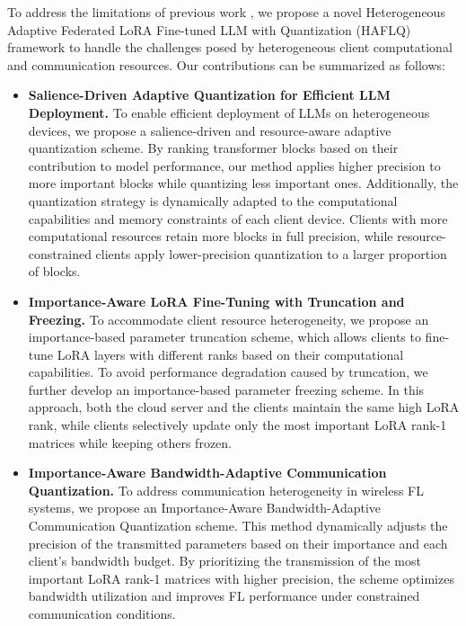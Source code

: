 \documentclass[journal]{IEEEtran}
\begin{document}
To address the limitations of previous work \cite{zhang2024towards,cho2023heterogeneous,jiamu2024federated,zhu2024promoting,fang2024automated}, we propose a novel Heterogeneous Adaptive Federated LoRA Fine-tuned LLM with Quantization (HAFLQ) framework to handle the challenges posed by heterogeneous client computational and communication resources.
Our contributions can be summarized as follows:
\begin{itemize}
\item \textbf{Salience-Driven Adaptive Quantization for Efficient LLM Deployment.} 
To enable efficient deployment of LLMs on heterogeneous devices, we propose a salience-driven and resource-aware adaptive quantization scheme. By ranking transformer blocks based on their contribution to model performance, our method applies higher precision to more important blocks while quantizing less important ones. Additionally, the quantization strategy is dynamically adapted to the computational capabilities and memory constraints of each client device. Clients with more computational resources retain more blocks in full precision, while resource-constrained clients apply lower-precision quantization to a larger proportion of blocks.

\item \textbf{Importance-Aware LoRA Fine-Tuning with Truncation and Freezing.} 
To accommodate client resource heterogeneity, we propose an importance-based parameter truncation scheme, which allows clients to fine-tune LoRA layers with different ranks based on their computational capabilities. To avoid performance degradation caused by truncation, we further develop an importance-based parameter freezing scheme. In this approach, both the cloud server and the clients maintain the same high LoRA rank, while clients selectively update only the most important LoRA rank-1 matrices while keeping others frozen.

\item \textbf{Importance-Aware Bandwidth-Adaptive Communication Quantization.} 
To address communication heterogeneity in wireless FL systems, we propose an Importance-Aware Bandwidth-Adaptive Communication Quantization scheme. This method dynamically adjusts the precision of the transmitted parameters based on their importance and each client’s bandwidth budget. By prioritizing the transmission of the most important LoRA rank-1 matrices with higher precision, the scheme optimizes bandwidth utilization and improves FL performance under constrained communication conditions.


\end{itemize}
\end{document}
